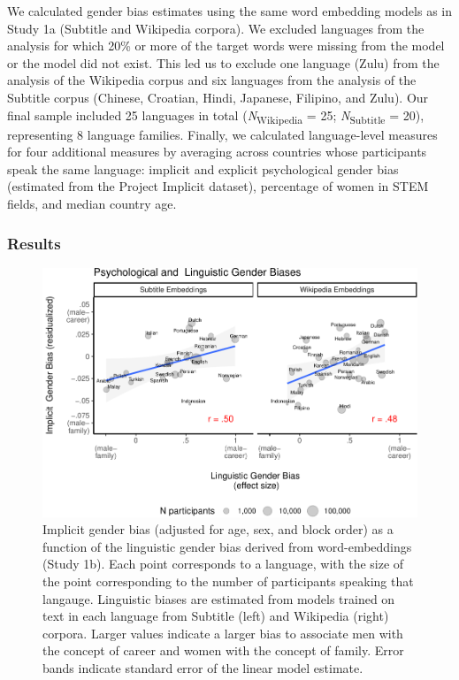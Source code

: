 \documentclass[man,floatsintext]{apa6}
\begin{document}
We calculated gender bias estimates using the same word embedding models as in Study 1a (Subtitle and Wikipedia corpora). We excluded languages from the analysis for which 20\% or more of the target words were missing from the model or the model did not exist. This led us to exclude one language (Zulu) from the analysis of the Wikipedia corpus and six languages from the analysis of the Subtitle corpus (Chinese, Croatian, Hindi, Japanese, Filipino, and Zulu). Our final sample included 25 languages in total (\emph{N}\textsubscript{Wikipedia} = 25; \emph{N}\textsubscript{Subtitle} = 20), representing 8 language families. Finally, we calculated language-level measures for four additional measures by averaging across countries whose participants speak the same language: implicit and explicit psychological gender bias (estimated from the Project Implicit dataset), percentage of women in STEM fields, and median country age.

\hypertarget{results-2}{%
\subsubsection{Results}\label{results-2}}

\begin{figure}
\centering
\includegraphics{iat_lang_files/figure-latex/unnamed-chunk-11-1.pdf}
\caption{\label{fig:unnamed-chunk-11}Implicit gender bias (adjusted for age, sex, and block order) as a function of the linguistic gender bias derived from word-embeddings (Study 1b). Each point corresponds to a language, with the size of the point corresponding to the number of participants speaking that langauge. Linguistic biases are estimated from models trained on text in each language from Subtitle (left) and Wikipedia (right) corpora. Larger values indicate a larger bias to associate men with the concept of career and women with the concept of family. Error bands indicate standard error of the linear model estimate.}
\end{figure}
\end{document}
